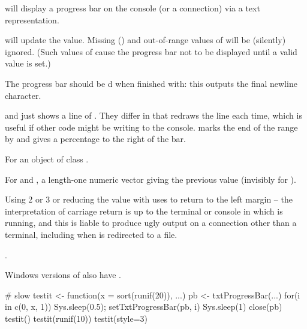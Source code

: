 \begin{Details}\relax
{} will display a progress bar on the \R{} console
(or a connection) via a text representation.

 will update the value.  Missing
() and out-of-range values of  will be
(silently) ignored.  (Such values of  cause the progress
bar not to be displayed until a valid value is set.)

The progress bar should be d when finished with: this
outputs the final newline character.

 and  just shows a line of
. They differ in that  redraws the line
each time, which is useful if other code might be writing to the \R{}
console.   marks the end of the range by \code{|} and
gives a percentage to the right of the bar.
\end{Details}
%
\begin{Value}
For  an object of class .

For  and , a
length-one numeric vector giving the previous value (invisibly for
).
\end{Value}
%
\begin{Note}\relax
Using  2 or 3 or reducing the value with 
uses  to return to the left margin -- the interpretation of
carriage return is up to the terminal or console in which \R{} is
running, and this is liable to produce ugly output on a connection
other than a terminal, including when  is
redirected to a file.
\end{Note}
%
\begin{SeeAlso}\relax
{}.

Windows versions of \R{} also have .
\end{SeeAlso}
%
\begin{Examples}
\begin{ExampleCode}
 # slow
testit <- function(x = sort(runif(20)), ...)
{
    pb <- txtProgressBar(...)
    for(i in c(0, x, 1)) {Sys.sleep(0.5); setTxtProgressBar(pb, i)}
    Sys.sleep(1)
    close(pb)
}
testit()
testit(runif(10))
testit(style=3)
\end{ExampleCode}
\end{Examples}
